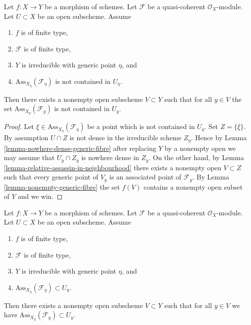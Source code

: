 \begin{lemma}
\label{lemma-bad-case}
Let $f : X \to Y$ be a morphism of schemes. Let $\mathcal{F}$ be a
quasi-coherent $\mathcal{O}_X$-module. Let $U \subset X$ be an open
subscheme. Assume
\begin{enumerate}
\item $f$ is of finite type,
\item $\mathcal{F}$ is of finite type,
\item $Y$ is irreducible with generic point $\eta$, and
\item $\text{Ass}_{X_\eta}(\mathcal{F}_\eta)$ is not contained in $U_\eta$.
\end{enumerate}
Then there exists a nonempty open subscheme $V \subset Y$ such that
for all $y \in V$ the set $\text{Ass}_{X_y}(\mathcal{F}_y)$ is not
contained in $U_y$.
\end{lemma}

\begin{proof}
Let $\xi \in \text{Ass}_{X_\eta}(\mathcal{F}_\eta)$ be a point
which is not contained in $U_\eta$. Set $Z = \overline{\{\xi\}}$.
By assumption $U \cap Z$ is not dense in the irreducible scheme $Z_\eta$.
Hence by
Lemma \ref{lemma-nowhere-dense-generic-fibre}
after replacing $Y$ by a nonempty open we may assume that $U_y \cap Z_y$
is nowhere dense in $Z_y$. On the other hand, by
Lemma \ref{lemma-relative-assassin-in-neighbourhood}
there exists a nonempty open $V \subset Z$ such that every
generic point of $V_y$ is an associated point of $\mathcal{F}_y$. By
Lemma \ref{lemma-nonempty-generic-fibre}
the set $f(V)$ contains a nonempty open subset of $Y$ and we win.
\end{proof}

\begin{lemma}
\label{lemma-good-case}
Let $f : X \to Y$ be a morphism of schemes. Let $\mathcal{F}$ be a
quasi-coherent $\mathcal{O}_X$-module. Let $U \subset X$ be an open
subscheme. Assume
\begin{enumerate}
\item $f$ is of finite type,
\item $\mathcal{F}$ is of finite type,
\item $Y$ is irreducible with generic point $\eta$, and
\item $\text{Ass}_{X_\eta}(\mathcal{F}_\eta) \subset U_\eta$.
\end{enumerate}
Then there exists a nonempty open subscheme $V \subset Y$ such that
for all $y \in V$ we have $\text{Ass}_{X_y}(\mathcal{F}_y) \subset U_y$.
\end{lemma}

